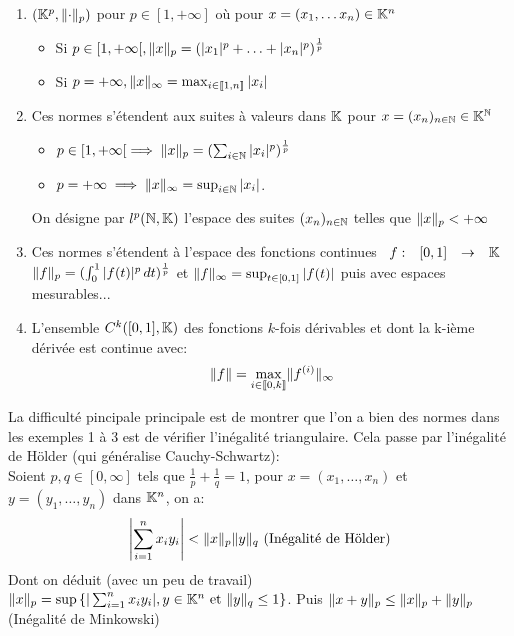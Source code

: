 \documentclass[]{report}
\begin{document}
    \begin{ex}{}{}
        \begin{enumerate}
            \item $(\mathbb{K}^p,\lVert \cdot \rVert_p)$ pour $p\in[1,+\infty]$ où pour $x=(x_1,\ldots x_n)\in \mathbb{K}^n$
            \begin{itemize}
                \item Si $p\in [1,+\infty[, \lVert x \rVert_p=(|x_1|^p+\ldots+|x_n|^p)^{\frac{1}{p}}$
                \item Si $p=+\infty, \lVert x \rVert_\infty=\max_{i\in \llbracket 1,n \rrbracket}|x_i|$
            \end{itemize}
            \item Ces normes s'étendent aux suites à valeurs dans $\mathbb{K}$ pour $x=(x_n)_{n\in\mathbb{N}}\in \mathbb{K}^{\mathbb{N}}$
            \begin{itemize}
                \item $p\in [1,+\infty[\implies \lVert x \rVert_p=(\sum_{i\in \mathbb{N}}|x_i|^p)^{\frac{1}{p}}$
                \item $p=+\infty\implies \lVert x \rVert_\infty=\sup_{i\in \mathbb{N}}|x_i|$.
            \end{itemize}
            On désigne par $l^p(\mathbb{N},\mathbb{K})$ l'espace des suites $(x_n)_{n\in\mathbb{N}}$ telles que $\lVert x \rVert_p< +\infty$
            \item Ces normes s'étendent à l'espace des fonctions continues $\begin{array}{ccccc} f : & [0,1] & \to & \mathbb{K} \end{array}$
            $\lVert f \rVert_p=(\int_{0}^{1}|f(t)|^p\, dt)^{\frac{1}{p}}$ et $\lVert f \rVert_\infty=\sup_{t\in [0,1]}|f(t)|$ puis avec espaces mesurables...
            \item L'ensemble $C^k([0,1],\mathbb{K})$ des fonctions $k$-fois dérivables et dont la k-ième dérivée est continue avec:
            \[\lVert f \rVert=\max_{i\in \llbracket 0,k\rrbracket}\lVert f^{(i)} \rVert_\infty\]
        \end{enumerate}
    \end{ex}

    \begin{re}{}{}
        La difficulté pincipale principale est de montrer que l'on a bien des normes dans les exemples 1 à 3 est de vérifier l'inégalité triangulaire. Cela passe par l'inégalité de Hölder (qui généralise Cauchy-Schwartz):\\
        Soient $p,q\in [0,\infty]$ tels que $\frac{1}{p}+\frac{1}{q}=1$, pour $x=(x_1,\ldots,x_n)$ et $y=(y_1,\ldots,y_n)$ dans $\mathbb{K}^n$, on a:
        \[\left|\sum_{i=1}^{n} x_i y_i\right|< \lVert x \rVert_p\lVert y \rVert_q\text{ (Inégalité de Hölder)}\]
        Dont on déduit (avec un peu de travail) $\lVert x \rVert_p=\sup\left\{|\sum_{i=1}^{n}x_i y_i|,y\in \mathbb{K}^n\text{ et }\lVert y \rVert_q\le 1\right\}$. Puis $\lVert x+y \rVert_p\le \lVert x \rVert_p+\lVert y \rVert_p$ (Inégalité de Minkowski)
    \end{re}
\end{document}
